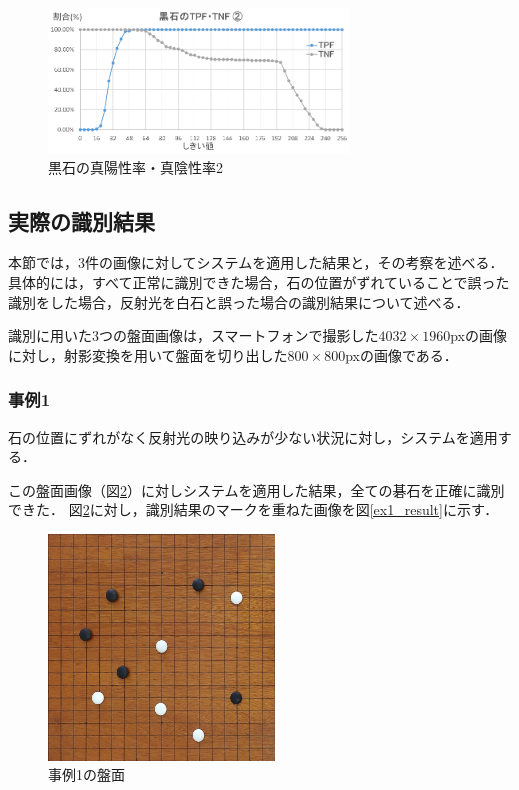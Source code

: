 \documentclass[openright]{nitocs}
\numberwithin{equation}{section}
\begin{document}
            \begin{figure}[tb] %
                \begin{center}
                \includegraphics[clip,width=80mm]{Case2_Black_TPF_TNF.eps} 
                \caption{黒石の真陽性率・真陰性率2}
                \label{Case2Black}
                \end{center}
            \end{figure}

        \subsection{実際の識別結果} %
        \label{identify_result}
            本節では，3件の画像に対してシステムを適用した結果と，その考察を述べる．
            具体的には，すべて正常に識別できた場合，石の位置がずれていることで誤った識別をした場合，反射光を白石と誤った場合の識別結果について述べる．

            識別に用いた3つの盤面画像は，スマートフォンで撮影した$4032\times1960$pxの画像に対し，射影変換を用いて盤面を切り出した$800\times800$pxの画像である．

            \subsubsection{事例1}
                石の位置にずれがなく反射光の映り込みが少ない状況に対し，システムを適用する．

                この盤面画像（図\ref{ex1}）に対しシステムを適用した結果，全ての碁石を正確に識別できた．
                図\ref{ex1}に対し，識別結果のマークを重ねた画像を図\ref{ex1_result}に示す．
                \begin{figure}[tb] %
                    \begin{center}
                    \includegraphics[clip,width=60mm]{DSC_0041/boardImg.jpg} 
                    \caption{事例1の盤面}
                    \label{ex1}
                    \end{center}
                \end{figure}
\end{document}
